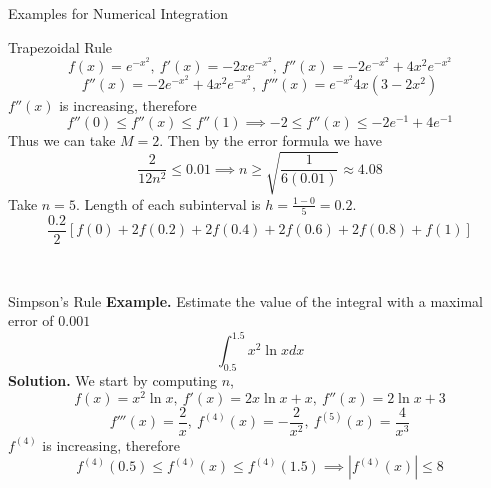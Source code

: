 \documentclass{article}
\begin{document}
\begin{multicols*}{3}
\begin{blackbox}{Examples for Numerical Integration}
\begin{brownbox}{Trapezoidal Rule}
{{            \[f(x) = e^{-x^2}, \ f'(x) = -2xe^{-x^2}, \ f''(x) = -2e^{-x^2} + 4x^2e^{-x^2}\]
            \[f''(x) = -2e^{-x^2} + 4x^2e^{-x^2}, \ f'''(x) = e^{-x^2}4x(3-2x^2)\]
            }
            $f''(x)$ is increasing, therefore \\[-1ex]
            {\scriptsize
            \[f''(0) \leq f''(x) \leq f''(1) \implies -2 \leq f''(x) \leq -2e^{-1} + 4e^{-1}\]
            }
            Thus we can take $M =2$. Then by the error formula we have\\[-2ex]
            \[\frac{2}{12n^2} \leq 0.01 \implies n \geq \sqrt{\frac{1}{6(0.01)}} \approx 4.08\]
            Take $n = 5$. Length of each subinterval is $h = \frac{1 -0}{5} = 0.2$. \\[-1.5ex]
            {\footnotesize
            \[\frac{0.2}{2}\left[f(0) + 2f(0.2) + 2f(0.4) +2f(0.6) + 2f(0.8) + f(1)\right]\]
            }
            }
            \vspace{-2.25ex}
        \end{brownbox}\\[-1ex]
    \end{blackbox}
    \begin{blackbox}{Simpson's Rule}
            \textbf{Example.} Estimate the value of the integral with a maximal error of $0.001$
            \[\int_{0.5}^{1.5}x^2\ln x dx\]
            \textbf{Solution.} We start by computing $n$,\\[-2ex]
            \[f(x) = x^2\ln x, \ f'(x) = 2x\ln x + x, \ f''(x) = 2\ln x + 3\]
            \[f'''(x) = \frac{2}{x}, \ f^{(4)}(x) = -\frac{2}{x^2}, \ f^{(5)}(x) = \frac{4}{x^3}\]
            $f^{(4)}$ is increasing, therefore\\[-2ex]
            \[f^{(4)}(0.5) \leq f^{(4)}(x) \leq f^{(4)}(1.5) \implies |f^{(4)}(x)| \leq 8\]
            

\end{blackbox}
\end{multicols*}
\end{document}
